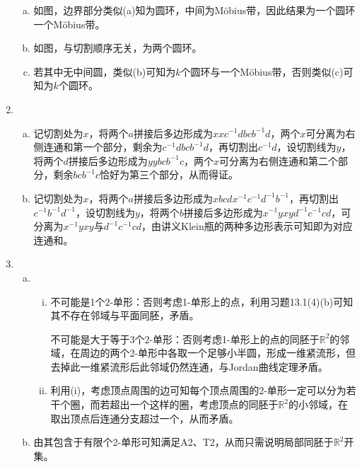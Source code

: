 \documentclass[a4paper,UTF8,fontset=windows]{ctexart}
\begin{document}
\begin{enumerate}[(1)]
\begin{enumerate}[(a)]
    \item
    如图，边界部分类似(a)知为圆环，中间为M\"obius带，因此结果为一个圆环一个M\"obius带。
    
    \item
    如图，与切割顺序无关，为两个圆环。
    
    \item
    若其中无中间圆，类似(b)可知为$k$个圆环与一个M\"obius带，否则类似(c)可知为$k$个圆环。
    \end{enumerate}
    
    \item
    \begin{enumerate}[(a)]
    \item
    记切割处为$x$，将两个$a$拼接后多边形成为$xxc^{-1}dbcb^{-1}d$，两个$x$可分离为右侧连通和第一个部分，剩余为$c^{-1}dbcb^{-1}d$，再切割出$c^{-1}d$，设切割线为$y$，将两个$d$拼接后多边形成为$yybcb^{-1}c$，两个$x$可分离为右侧连通和第二个部分，剩余$bcb^{-1}c$恰好为第三个部分，从而得证。
    
    \item
    记切割处为$x$，将两个$a$拼接后多边形成为$xbcdx^{-1}c^{-1}d^{-1}b^{-1}$，再切割出$c^{-1}b^{-1}d^{-1}$，设切割线为$y$，将两个$b$拼接后多边形成为$x^{-1}yxyd^{-1}c^{-1}cd$，可分离为$x^{-1}yxy$与$d^{-1}c^{-1}cd$，由讲义Klein瓶的两种多边形表示可知即为对应连通和。
    \end{enumerate}
    
    \item
    \begin{enumerate}[(a)]
    \item
    \begin{enumerate}[(i)]
    \item
    不可能是1个2-单形：否则考虑1-单形上的点，利用习题13.1(4)(b)可知其不存在邻域与平面同胚，矛盾。
    
    不可能是大于等于3个2-单形：否则考虑1-单形上的点的同胚于$\mathbb{R}^2$的邻域，在周边的两个2-单形中各取一个足够小半圆，形成一维紧流形，但去掉此一维紧流形后此邻域仍然连通，与Jordan曲线定理矛盾。
    
    \item
    利用(i)，考虑顶点周围的边可知每个顶点周围的2-单形一定可以分为若干个圈，而若超出一个这样的圈，考虑顶点的同胚于$\mathbb{R}^2$的小邻域，在取出顶点后连通分支超过一个，从而矛盾。
    \end{enumerate}
    
    \item
    由其包含于有限个2-单形可知满足A2、T2，从而只需说明局部同胚于$\mathbb{R}^2$开集。
    

\end{enumerate}
\end{enumerate}
\end{document}
